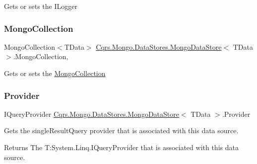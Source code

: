 Gets or sets the I\+Logger 

\mbox{\label{classCqrs_1_1Mongo_1_1DataStores_1_1MongoDataStore_aa183a8ce44ec16d755f1e4fbe5ec4b10_aa183a8ce44ec16d755f1e4fbe5ec4b10}} 
\subsubsection{\texorpdfstring{Mongo\+Collection}{MongoCollection}}
{\footnotesize\ttfamily Mongo\+Collection$<$T\+Data$>$ \hyperlink{classCqrs_1_1Mongo_1_1DataStores_1_1MongoDataStore}{Cqrs.\+Mongo.\+Data\+Stores.\+Mongo\+Data\+Store}$<$ T\+Data $>$.Mongo\+Collection\hspace{0.3cm}{\ttfamily [get]}, {\ttfamily [protected]}}



Gets or sets the \hyperlink{classCqrs_1_1Mongo_1_1DataStores_1_1MongoDataStore_aa183a8ce44ec16d755f1e4fbe5ec4b10_aa183a8ce44ec16d755f1e4fbe5ec4b10}{Mongo\+Collection} 

\mbox{\label{classCqrs_1_1Mongo_1_1DataStores_1_1MongoDataStore_ae5de32a7a0da67a8aeaed9653db796ce_ae5de32a7a0da67a8aeaed9653db796ce}} 
\subsubsection{\texorpdfstring{Provider}{Provider}}
{\footnotesize\ttfamily I\+Query\+Provider \hyperlink{classCqrs_1_1Mongo_1_1DataStores_1_1MongoDataStore}{Cqrs.\+Mongo.\+Data\+Stores.\+Mongo\+Data\+Store}$<$ T\+Data $>$.Provider\hspace{0.3cm}{\ttfamily [get]}}



Gets the single\+Result\+Query provider that is associated with this data source. 

\begin{DoxyReturn}{Returns}
The T\+:\+System.\+Linq.\+I\+Query\+Provider that is associated with this data source. 
\end{DoxyReturn}
